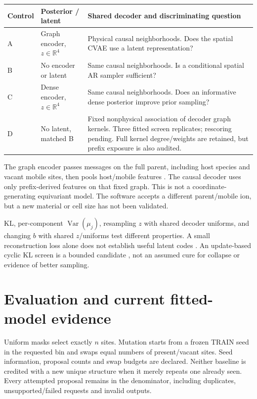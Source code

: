 \documentclass[10pt]{article}
\begin{document}
\begin{center}\small
\begin{tabular}{p{.07\linewidth}p{.23\linewidth}p{.57\linewidth}}
\toprule Control & Posterior / latent & Shared decoder and discriminating question\\\midrule
A & Graph encoder, $z\in\mathbb R^4$ & Physical causal neighborhoods. Does the spatial CVAE use a latent representation?\\
B & No encoder or latent & Same causal neighborhoods. Is a conditional spatial AR sampler sufficient?\\
C & Dense encoder, $z\in\mathbb R^4$ & Same causal neighborhoods. Does an informative dense posterior improve prior sampling?\\
D & No latent, matched B & Fixed nonphysical association of decoder graph kernels. Three fitted screen replicates; rescoring pending. Full kernel degree/weights are retained, but prefix exposure is also audited.\\\bottomrule
\end{tabular}
\end{center}
The graph encoder passes messages on the full parent, including host species
and vacant mobile sites, then pools host/mobile features \cite{gilmer2017}.
The causal decoder uses only prefix-derived features on that fixed graph.
This is not a coordinate-generating equivariant model. The software accepts a
different parent/mobile ion, but a new material or cell size has not been validated.

KL, per-component $\operatorname{Var}(\mu_j)$, resampling $z$ with shared decoder
uniforms, and changing $b$ with shared $z$/uniforms test different properties.
A small reconstruction loss alone does not establish useful latent codes
\cite{alemi2018}. An update-based cyclic KL screen is a bounded candidate
\cite{fu2019}, not an assumed cure for collapse or evidence of better sampling.
\newpage

\section{Evaluation and current fitted-model evidence}
Uniform masks select exactly $n$ sites. Mutation starts from a frozen TRAIN seed
in the requested bin and swaps equal numbers of present/vacant sites. Seed
information, proposal counts and swap budgets are declared. Neither baseline
is credited with a new unique structure when it merely repeats one already
seen. Every attempted proposal remains in the denominator, including duplicates,
unsupported/failed requests and invalid outputs.
\end{document}
